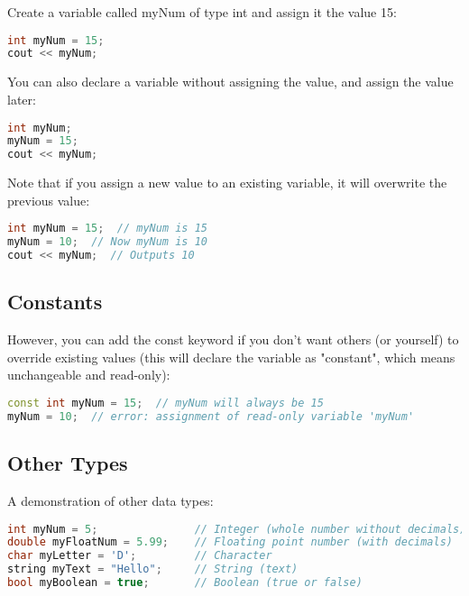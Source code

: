 \documentclass[12pt]{book}
\begin{document}
Create a variable called myNum of type int and assign it the value 15:

\lstset{style=mystyle}
\begin{lstlisting}[language=C++, caption=C++ example]
int myNum = 15;
cout << myNum;
\end{lstlisting}

You can also declare a variable without assigning the value, and assign the value later:


\lstset{style=mystyle}
\begin{lstlisting}[language=C++, caption=C++ example]
int myNum;
myNum = 15;
cout << myNum;
\end{lstlisting}


Note that if you assign a new value to an existing variable, it will overwrite the previous value:


\lstset{style=mystyle}
\begin{lstlisting}[language=C++, caption=C++ example]
int myNum = 15;  // myNum is 15
myNum = 10;  // Now myNum is 10
cout << myNum;  // Outputs 10
\end{lstlisting}


\subsection{Constants}

However, you can add the const keyword if you don't want others (or yourself) to override existing values (this will declare the variable as "constant", which means unchangeable and read-only):

\lstset{style=mystyle}
\begin{lstlisting}[language=C++, caption=C++ example]
const int myNum = 15;  // myNum will always be 15
myNum = 10;  // error: assignment of read-only variable 'myNum'
\end{lstlisting}


\subsection{Other Types}

A demonstration of other data types:

\lstset{style=mystyle}
\begin{lstlisting}[language=C++, caption=C++ example]
int myNum = 5;               // Integer (whole number without decimals)
double myFloatNum = 5.99;    // Floating point number (with decimals)
char myLetter = 'D';         // Character
string myText = "Hello";     // String (text)
bool myBoolean = true;       // Boolean (true or false)
\end{lstlisting}
\end{document}
